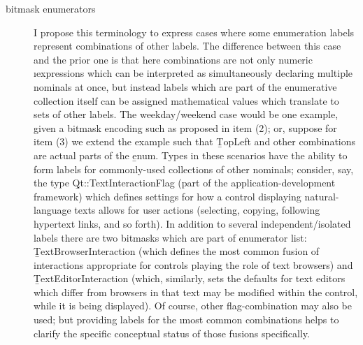 {\begin{description}
\item[ bitmask enumerators]  I propose
this terminology to express cases where some enumeration
labels represent combinations of other labels. \> The difference
between this case and the prior one is that here combinations
are not only numeric \i{expressions} which can be interpreted as
simultaneously declaring multiple nominals at once,
but instead labels which are part of the enumerative collection
itself can be assigned mathematical values which translate
to sets of other labels. \> The weekday/weekend case would
be one example, given a bitmask encoding such as proposed
in item (2); or, suppose for item (3) we extend the 
example such that \b{TopLeft} and other combinations are
actual parts of the \b{enum}. \> Types in these scenarios
have the ability to form labels for commonly-used collections
of other nominals; consider, say, the type \b{Qt::TextInteractionFlag}
(part of the \Qt{} application-development framework) which defines
settings for how a \GUI{} control displaying natural-language
texts allows for user actions (selecting, copying, following
hypertext links, and so forth). \> In addition to
several independent/isolated labels there are two
bitmasks which are part of enumerator list: \b{TextBrowserInteraction}
(which defines the most common fusion of interactions
appropriate for controls playing the role of text browsers) and
\b{TextEditorInteraction} (which, similarly, sets the defaults
for text editors \mdash{} which differ from browsers in that text may
be modified within the control, while it is being displayed).
\> Of course, other flag-combination may also be used; but
providing labels for the \i{most common} combinations
helps to clarify the specific conceptual status of
those fusions specifically.


\end{description}}
